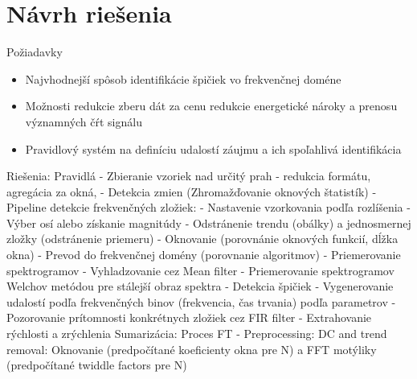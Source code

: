 \chapter{Návrh riešenia}
Požiadavky
\begin{itemize}
\item Najvhodnejší spôsob identifikácie špičiek vo frekvenčnej doméne
\item Možnosti redukcie zberu dát za cenu redukcie energetické nároky a prenosu významných čŕt signálu
\item Pravidlový systém na definíciu udalostí záujmu a ich spoľahlivá identifikácia
\end{itemize}

Riešenia:
Pravidlá
	- Zbieranie vzoriek nad určitý prah - redukcia formátu, agregácia za okná,
	- Detekcia zmien (Zhromažďovanie oknových štatistík)
	- Pipeline detekcie frekvenčných zložiek:
		- Nastavenie vzorkovania podľa rozlíšenia
		- Výber osí alebo získanie magnitúdy
		- Odstránenie trendu (obálky) a jednosmernej zložky (odstránenie priemeru)
		- Oknovanie (porovnánie oknových funkcií, dĺžka okna)
		- Prevod do frekvenčnej domény (porovnanie algoritmov)
		- Priemerovanie spektrogramov
		- Vyhladzovanie cez Mean filter
		- Priemerovanie spektrogramov Welchov metódou pre stálejší obraz spektra
		- Detekcia špičiek
		- Vygenerovanie udalostí podľa frekvenčných binov (frekvencia, čas trvania) podľa parametrov
	- Pozorovanie prítomnosti konkrétnych zložiek cez FIR filter
	- Extrahovanie rýchlosti a zrýchlenia
Sumarizácia:
Proces FT - Preprocessing: DC and trend removal:
Oknovanie (predpočítané koeficienty okna pre N) a
FFT motýliky (predpočítané twiddle factors pre N)
\emptypage
